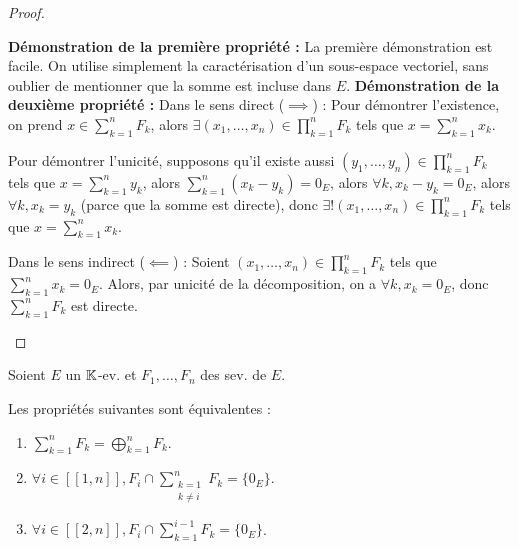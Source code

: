 \documentclass[12pt,a4paper]{report}
\begin{document}
\begin{proof}
    \begin{outline}[enumerate]
        \1 \textbf{Démonstration de la première propriété :} La première démonstration est facile. On utilise simplement la caractérisation d'un sous-espace vectoriel, sans oublier de mentionner que la somme est incluse dans $E$.
        \1 \textbf{Démonstration de la deuxième propriété :}
            \2 Dans le sens direct ($\implies$) :
                \3 Pour démontrer l'existence, on prend $x \in \sum_{k=1}^n F_k$, alors $\exists (x_1,\dots,x_n) \in \prod_{k=1}^n F_k$ tels que $x = \sum_{k=1}^n x_k$.
                
                \3 Pour démontrer l'unicité, supposons qu'il existe aussi $(y_1,\dots,y_n) \in \prod_{k=1}^n F_k$ tels que $x = \sum_{k=1}^n y_k$, alors $\sum_{k=1}^n (x_k - y_k) = 0_E$, alors $\forall k, x_k - y_k = 0_E$, alors $\forall k, x_k = y_k$ (parce que la somme est directe), donc $\exists ! (x_1,\dots,x_n) \in \prod_{k=1}^n F_k$ tels que $x = \sum_{k=1}^n x_k$.

            \2 Dans le sens indirect ($\impliedby$) :
                \3 Soient $(x_1,\dots,x_n) \in \prod_{k=1}^n F_k$ tels que $\sum_{k=1}^n x_k = 0_E$.
                \3 Alors, par unicité de la décomposition, on a $\forall k, x_k = 0_E$, donc $\sum_{k=1}^n F_k$ est directe.
    \end{outline}
\end{proof}

\begin{property}
    Soient $E$ un $\mathbb{K}$-ev. et $F_1,\dots,F_n$ des sev. de $E$.

    Les propriétés suivantes sont équivalentes :

    \begin{enumerate}
        \item $\sum_{k=1}^n F_k = \bigoplus_{k=1}^n F_k$.
        \item $\forall i \in [\![1,n]\!], F_i \cap \sum_{\substack{k=1 \\ k \ne i}}^n F_k = \{0_E\}$.
        \item $\forall i \in [\![2,n]\!], F_i \cap \sum_{k=1}^{i-1} F_k = \{0_E\}$.
    \end{enumerate}
\end{property}
\end{document}
